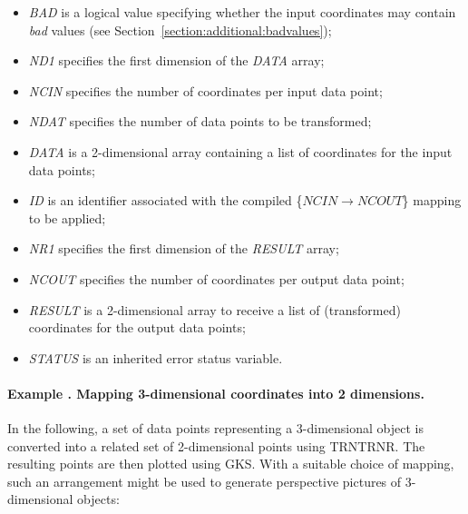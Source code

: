 \documentclass[twoside,11pt]{article}
\renewcommand{\_}{\texttt{\symbol{95}}}
\newcommand{\name}[1]{\mbox{\small{#1}}}
\newcommand{\fortvar}[1]{\mbox{\emph{#1}}}
\newcounter{examplecounter}
\newcommand{\example}[1]{\addtocounter{examplecounter}{1}
                         \paragraph{\textbf{Example \theexamplecounter. #1}}}
\begin{document}
\begin{itemize}

\item \fortvar{BAD} is a logical value specifying whether the input
coordinates may contain \emph{bad} values (see
Section~\ref{section:additional:badvalues});

\item \fortvar{ND1} specifies the first dimension of the \fortvar{DATA}
array;

\item \fortvar{NCIN} specifies the number of coordinates per input data
point;

\item \fortvar{NDAT} specifies the number of data points to be transformed;

\item \fortvar{DATA} is a 2-dimensional array containing a list of
coordinates for the input data points;

\item \fortvar{ID} is an identifier associated with the compiled
\mbox{\{$NCIN \rightarrow NCOUT$\}} mapping to be applied;

\item \fortvar{NR1} specifies the first dimension of the \fortvar{RESULT}
array;

\item \fortvar{NCOUT} specifies the number of coordinates per output data
point;

\item \fortvar{RESULT} is a 2-dimensional array to receive a list of
(transformed) coordinates for the output data points;

\item \fortvar{STATUS} is an inherited error status variable.

\end{itemize}

\example{Mapping 3-dimensional coordinates into 2 dimensions.}
In the following, a set of data points representing a 3-dimensional object
is converted into a related set of 2-dimensional points using
\name{TRN\_TRNR}.
The resulting points are then plotted using \name{GKS}.
With a suitable choice of mapping, such an arrangement might be used to
generate perspective pictures of 3-dimensional objects:
\end{document}
